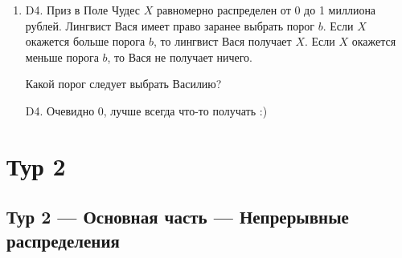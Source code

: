 \documentclass[12pt]{article}
\newenvironment{problem}{}{}
\newenvironment{sol}{}{} %
\begin{document}
\begin{enumerate}
\begin{problem}
\item[D4.] Приз в Поле Чудес $X$ равномерно распределен от 0 до 1 миллиона рублей. Лингвист Вася имеет право заранее выбрать порог $b$. Если $X$ окажется больше порога $b$, то лингвист Вася получает $X$. Если $X$ окажется меньше порога $b$, то Вася не получает ничего.

Какой порог следует выбрать Василию?

\begin{sol}
D4. Очевидно 0, лучше всегда что-то получать :)
\end{sol}
\end{problem}
\end{enumerate}


\newpage
\section{Тур 2}

\subsection{Тур 2 — Основная часть — Непрерывные распределения}
\end{document}
